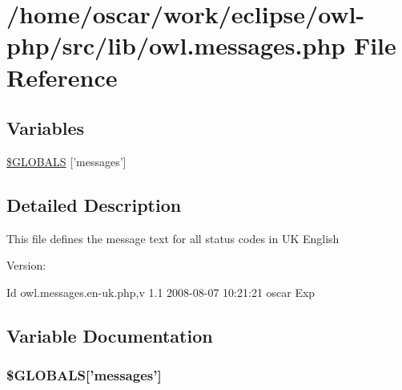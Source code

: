 \hypertarget{owl_8messages_8php}{
\section{/home/oscar/work/eclipse/owl-php/src/lib/owl.messages.php File Reference}
\label{owl_8messages_8php}
}
\subsection*{Variables}
\begin{CompactItemize}
\item 
\hyperlink{owl_8messages_8php_65f2996116eed36e9ab25f254a470259}{\$GLOBALS} \mbox{[}'messages'\mbox{]}
\end{CompactItemize}


\subsection{Detailed Description}
This file defines the message text for all status codes in UK English \begin{Desc}
\item[Version:]\end{Desc}
\begin{Desc}
\item[Id]owl.messages.en-uk.php,v 1.1 2008-08-07 10:21:21 oscar Exp \end{Desc}


\subsection{Variable Documentation}
\hypertarget{owl_8messages_8php_65f2996116eed36e9ab25f254a470259}{
\subsubsection{\setlength{\rightskip}{0pt plus 5cm}\$GLOBALS\mbox{[}'messages'\mbox{]}}}
\label{owl_8messages_8php_65f2996116eed36e9ab25f254a470259}


